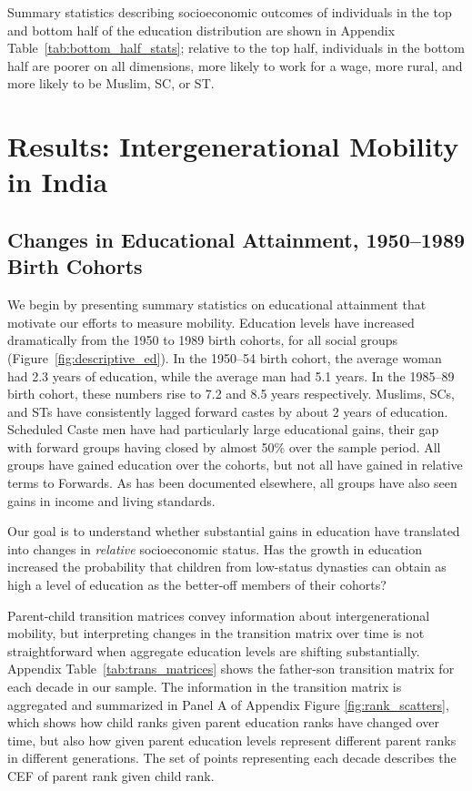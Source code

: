 \documentclass[12pt,letterpaper]{article}
\numberwithin{equation}{section}
\begin{document}
Summary statistics describing socioeconomic outcomes of individuals in the top and bottom half of the education distribution are shown in Appendix Table~\ref{tab:bottom_half_stats}; relative to the top half, individuals in the bottom half are poorer on all dimensions, more likely to work for a wage, more rural, and more likely to be Muslim, SC, or ST.

\section{Results: Intergenerational Mobility in India}
\label{sec:results}

\subsection{Changes in Educational Attainment, 1950--1989 Birth Cohorts}
We begin by presenting summary statistics on educational attainment that motivate our efforts to measure mobility. Education levels have increased dramatically from the 1950 to 1989 birth cohorts, for all social groups (Figure~\ref{fig:descriptive_ed}). In the 1950--54 birth cohort, the average woman had 2.3 years of education, while the average man had 5.1 years. In the 1985--89 birth cohort, these numbers rise to 7.2 and 8.5 years respectively. Muslims, SCs, and STs have consistently lagged forward castes by about 2 years of education. Scheduled Caste men have had particularly large educational gains, their gap with forward groups having closed by almost 50\% over the sample period. All groups have gained education over the cohorts, but not all have gained in relative terms to Forwards. As has been documented elsewhere, all groups have also seen gains in income and living standards.

Our goal is to understand whether substantial gains in education have translated into changes in \textit{relative} socioeconomic status. Has the growth in education increased the probability that children from low-status dynasties can obtain as high a level of education as the better-off members of their cohorts?

Parent-child transition matrices convey information about intergenerational mobility, but interpreting changes in the transition matrix over time is not straightforward when aggregate education levels are shifting substantially. Appendix Table~\ref{tab:trans_matrices} shows the father-son transition matrix for each decade in our sample. The information in the transition matrix is aggregated and summarized in Panel A of Appendix Figure \ref{fig:rank_scatters}, which shows how child ranks given parent education ranks have changed over time, but also how given parent education levels represent different parent ranks in different generations. The set of points representing each decade describes the CEF of parent rank given child rank. 
\end{document}
